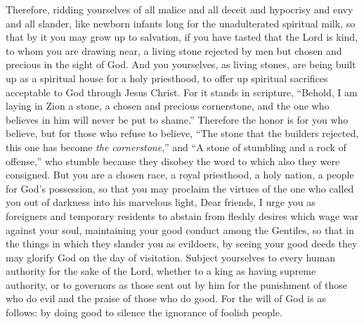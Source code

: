 \begin{biblechapter} %
 Therefore, ridding yourselves of all malice and all deceit and hypocrisy and envy and all slander,
\verse like newborn infants long for the unadulterated spiritual milk, so that by it you may grow up to salvation,
\verse if you have tasted that the Lord is kind,
\verse to whom you are drawing near, a living stone rejected by men but chosen and precious in the sight of God.
\verse And you yourselves, as living stones, are being built up as a spiritual house for a holy priesthood, to offer up spiritual sacrifices acceptable to God through Jesus Christ.
\verse For it stands in scripture, “Behold, I am laying in Zion a stone, a chosen and precious cornerstone, 
and the one who believes in him will never be put to shame.”
\verse Therefore the honor is for you who believe, but for those who refuse to believe, “The stone that the builders rejected, 
this one has become \textit{the cornerstone},”
\verse and “A stone of stumbling and a rock of offense,”
\verse who stumble because they disobey the word to which also they were consigned.
\verse But you are a chosen race, a royal priesthood, a holy nation, a people for God’s possession, so that you may proclaim the virtues of the one who called you out of darkness into his marvelous light,
\verse Dear friends, I urge you as foreigners and temporary residents to abstain from fleshly desires which wage war against your soul,
\verse maintaining your good conduct among the Gentiles, so that in the things in which they slander you as evildoers, by seeing your good deeds they may glorify God on the day of visitation.
 Subject yourselves to every human authority for the sake of the Lord, whether to a king as having supreme authority,
\verse or to governors as those sent out by him for the punishment of those who do evil and the praise of those who do good.
\verse For the will of God is as follows: by doing good to silence the ignorance of foolish people.

\end{biblechapter}

